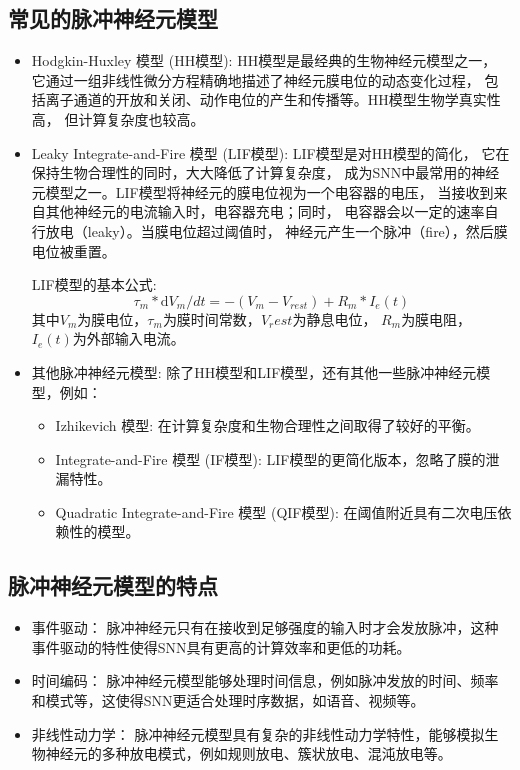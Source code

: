 \documentclass[12pt, a4paper, oneside]{ctexart}
\numberwithin{equation}{section}  %
\def\d{\mathrm{d}}          %
\begin{document}
\subsection{常见的脉冲神经元模型}
\begin{itemize}
    \item Hodgkin-Huxley 模型 (HH模型): HH模型是最经典的生物神经元模型之一，
    它通过一组非线性微分方程精确地描述了神经元膜电位的动态变化过程，
    包括离子通道的开放和关闭、动作电位的产生和传播等。HH模型生物学真实性高，
    但计算复杂度也较高。
    \item Leaky Integrate-and-Fire 模型 (LIF模型): LIF模型是对HH模型的简化，
    它在保持生物合理性的同时，大大降低了计算复杂度，
    成为SNN中最常用的神经元模型之一。LIF模型将神经元的膜电位视为一个电容器的电压，
    当接收到来自其他神经元的电流输入时，电容器充电；同时，
    电容器会以一定的速率自行放电（leaky）。当膜电位超过阈值时，
    神经元产生一个脉冲（fire），然后膜电位被重置。

    LIF模型的基本公式:
    \begin{equation}
        \tau_m * \d V_m/dt = -(V_m - V_{rest}) + R_m * I_e(t)
    \end{equation}
    其中$V_m$为膜电位，$\tau_m$为膜时间常数，$V_rest$为静息电位，
    $R_m$为膜电阻，$I_e(t)$为外部输入电流。
    \item 其他脉冲神经元模型:  除了HH模型和LIF模型，还有其他一些脉冲神经元模型，例如：
    \begin{itemize}
        \item Izhikevich 模型: 在计算复杂度和生物合理性之间取得了较好的平衡。
        \item Integrate-and-Fire 模型 (IF模型): LIF模型的更简化版本，忽略了膜的泄漏特性。
        \item Quadratic Integrate-and-Fire 模型 (QIF模型): 在阈值附近具有二次电压依赖性的模型。
    \end{itemize}
\end{itemize}

\subsection{脉冲神经元模型的特点}
\begin{itemize}
    \item 事件驱动： 脉冲神经元只有在接收到足够强度的输入时才会发放脉冲，这种事件驱动的特性使得SNN具有更高的计算效率和更低的功耗。
    \item 时间编码： 脉冲神经元模型能够处理时间信息，例如脉冲发放的时间、频率和模式等，这使得SNN更适合处理时序数据，如语音、视频等。
    \item 非线性动力学： 脉冲神经元模型具有复杂的非线性动力学特性，能够模拟生物神经元的多种放电模式，例如规则放电、簇状放电、混沌放电等。
\end{itemize}
\end{document}
